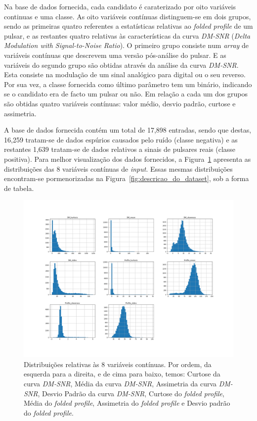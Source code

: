 \documentclass[]{article}
\begin{document}
	Na base de dados fornecida, cada candidato é caraterizado por oito variáveis continuas e uma classe. As oito variáveis contínuas distinguem-se em dois grupos, sendo  as primeiras quatro referentes a estatísticas relativas ao \textit{folded profile} de um pulsar, e as restantes quatro relativas às características da curva \textit{DM-SNR} (\textit{Delta Modulation with Signal-to-Noise Ratio}). O primeiro grupo consiste num \textit{array} de variáveis contínuas que descrevem uma versão pós-análise do pulsar. E as variáveis do segundo grupo são obtidas através da análise da curva \textit{DM-SNR}. Esta consiste na modulação de um sinal analógico para digital ou o seu reverso. Por sua vez, a classe fornecida como último parâmetro tem um binário, indicando se o candidato era de facto um pulsar ou não. Em relação a cada um dos grupos são obtidas quatro variáveis contínuas: valor médio, desvio padrão, curtose e assimetria.

	A base de dados fornecida contém um total de 17,898 entradas, sendo que destas, 16,259 tratam-se de dados espúrios causados pelo ruído (classe negativa) e as restantes 1,639 tratam-se de dados relativos a sinais de pulsares reais (classe positiva). Para melhor visualização dos dados fornecidos, a Figura~\ref{fig:distribuicoes} apresenta as distribuições das 8 variáveis contínuas de \textit{input}. Essas mesmas distribuições encontram-se pormenorizadas na Figura~\ref{fig:descricao_do_dataset}, sob a forma de tabela.

    \begin{figure}[h]
	\centering
	\includegraphics[scale=0.3]{img/distribution.png}
    \caption{Distribuições relativas às 8 variáveis contínuas. Por ordem, da esquerda para a direita, e de cima para baixo, temos: Curtose da curva \textit{DM-SNR}, Média da curva \textit{DM-SNR}, Assimetria da curva \textit{DM-SNR}, Desvio Padrão da curva \textit{DM-SNR}, Curtose do \textit{folded profile}, Média do \textit{folded profile}, Assimetria do \textit{folded profile} e Desvio padrão do \textit{folded profile}.}
    \label{fig:distribuicoes}
    \end{figure}
    
\end{document}
